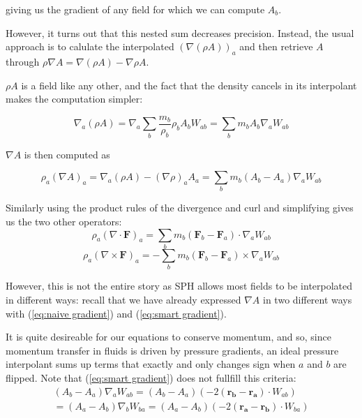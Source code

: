 \documentclass[../main.tex]{subfiles}
\begin{document}
giving us the gradient of any field for which we can compute $A_b$.

However, it turns out \autocite{sph} that this nested sum decreases precision. Instead, the
usual approach is to calulate the interpolated $(\nabla(\rho A))_a$ and then retrieve $A$ through
$\rho\nabla A = \nabla(\rho A) - \nabla\rho A$.

$\rho A$ is a field like any other, and the fact that the density cancels in its interpolant makes
the computation simpler:

\begin{equation}
    \nabla_a (\rho A)
    = \nabla_a \sum_b \frac{m_b}{\rho_b} \rho_b A_b W_{ab}
    = \sum_b m_b A_b \nabla_a W_{ab}
\end{equation}

$\nabla A$ is then computed as

\begin{equation} \label{eq:smart gradient}
    \rho_a (\nabla A)_a
    = \nabla_a (\rho A) - (\nabla\rho)_a A_a
    = \sum_b m_b (A_b - A_a) \nabla_a W_{ab}
\end{equation}

Similarly using the product rules of the divergence and curl and simplifying gives us the two other
operators:
\begin{equation} \label{eq:divergence interpolant}
    \rho_a (\nabla\cdot\bm{F})_a
    = \sum_b m_b (\bm{F}_b - \bm{F}_a) \cdot \nabla_a W_{ab}
\end{equation}
\begin{equation}
    \rho_a (\nabla\times\bm{F})_a
    = - \sum_b m_b (\bm{F}_b - \bm{F}_a) \times \nabla_a W_{ab}
\end{equation}

However, this is not the entire story as SPH allows most fields to be interpolated in different
ways: recall that we have already expressed $\nabla A$ in two different ways with
(\ref{eq:naive gradient}) and
(\ref{eq:smart gradient}).

It is quite desireable for our equations to conserve momentum, and so, since momentum transfer in
fluids is driven by pressure gradients, an ideal pressure interpolant sums up terms that exactly and
only changes sign when $a$ and $b$ are flipped. Note that (\ref{eq:smart gradient}) does not fullfill this
criteria:
\begin{equation}
\begin{split}
    (A_b - A_a) \nabla_a W_{ab} = (A_b - A_a) (-2(\bm{r_b} - \bm{r_a}) \cdot W_{ab}) \\
    = (A_a - A_b) \nabla_b W_{ba} = (A_a - A_b) (-2(\bm{r_a} - \bm{r_b}) \cdot W_{ba})
\end{split}
\end{equation}
\end{document}
